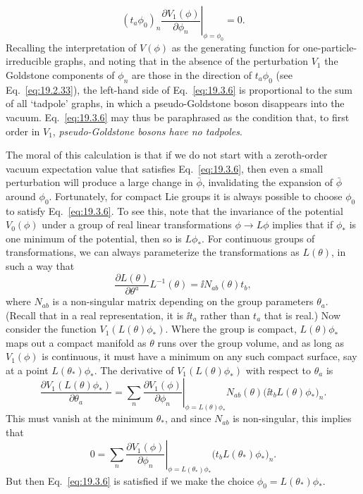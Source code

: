 \begin{equation}
\left.(t_a\phi_0)_n
\frac{\partial V_1(\phi)}{\partial\phi_n}\right|_{\phi=\phi_0}=0.
\tag{19.3.6}\label{eq:19.3.6}
\end{equation}
Recalling the interpretation of $V(\phi)$ as the generating function for one-particle-irreducible graphs, and noting that in the absence of the perturbation $V_1$ the Goldstone components of $\phi_n$ are those in the direction of $t_a\phi_0$ (see Eq.~\eqref{eq:19.2.33}), the left-hand side of Eq.~\eqref{eq:19.3.6} is proportional to the sum of all `tadpole' graphs, in which a pseudo-Goldstone boson disappears into the vacuum. Eq.~\eqref{eq:19.3.6} may thus be paraphrased as the condition that, to first order in $V_1$, \emph{pseudo-Goldstone bosons have no tadpoles}.

The moral of this calculation is that if we do not start with a zeroth-order vacuum expectation value that satisfies Eq.~\eqref{eq:19.3.6}, then even a small perturbation will produce a large change in $\bar\phi$, invalidating the expansion of $\bar\phi$ around $\phi_0$. Fortunately, for compact Lie groups it is always possible to choose $\phi_0$ to satisfy Eq.~\eqref{eq:19.3.6}. To see this, note that the invariance of the potential $V_0(\phi)$ under a group of real linear transformations $\phi\to L\phi$ implies that if $\phi_*$ is one minimum of the potential, then so is $L\phi_*$. For continuous groups of transformations, we can always parameterize the transformations as $L(\theta)$, in such a way that
\begin{equation}
\frac{\partial L(\theta)}{\partial\theta^a}L^{-1}(\theta)
=\ii N_{ab}(\theta)t_b,
\tag{19.3.7}\label{eq:19.3.7}
\end{equation}
where $N_{ab}$ is a non-singular matrix depending on the group parameters $\theta_a$. (Recall that in a real representation, it is $\ii t_a$ rather than $t_a$ that is real.) Now consider the function $V_1(L(\theta)\phi_*)$. Where the group is compact, $L(\theta)\phi_*$ maps out a compact manifold as $\theta$ runs over the group volume, and as long as $V_1(\phi)$ is continuous, it must have a minimum on any such compact surface, say at a point $L(\theta_*)\phi_*$. The derivative of $V_1(L(\theta)\phi_*)$ with respect to $\theta_a$ is
\begin{equation}
\frac{\partial V_1(L(\theta)\phi_*)}{\partial\theta_a}
=\left.\sum_n\frac{\partial V_1(\phi)}{\partial\phi_n}
\right|_{\phi=L(\theta)\phi_*}
N_{ab}(\theta)
\bigl(\ii t_b L(\theta)\phi_*\bigr)_n.
\tag{19.3.8}\label{eq:19.3.8}
\end{equation}
This must vanish at the minimum $\theta_*$, and since $N_{ab}$ is non-singular, this implies that
\begin{equation}
0=\left.\sum_n\frac{\partial V_1(\phi)}{\partial\phi_n}
\right|_{\phi=L(\theta_*)\phi_*}
\bigl(t_b L(\theta_*)\phi_*\bigr)_n.
\tag{19.3.9}\label{eq:19.3.9}
\end{equation}
But then Eq.~\eqref{eq:19.3.6} is satisfied if we make the choice $\phi_0=L(\theta_*)\phi_*$.

